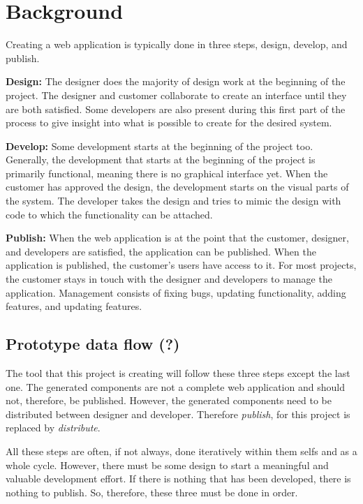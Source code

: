 \newpage
\section{Background}

Creating a web application is typically done in three steps, design, develop, and publish.

\textbf{Design:} The designer does the majority of design work at the beginning of the project. The designer and customer collaborate to create an interface until they are both satisfied.  Some developers are also present during this first part of the process to give insight into what is possible to create for the desired system.

\textbf{Develop:} Some development starts at the beginning of the project too. Generally, the development that starts at the beginning of the project is primarily functional, meaning there is no graphical interface yet. When the customer has approved the design, the development starts on the visual parts of the system. The developer takes the design and tries to mimic the design with code to which the functionality can be attached.  

\textbf{Publish:} When the web application is at the point that the customer, designer, and developers are satisfied, the application can be published. When the application is published, the customer's users have access to it. For most projects, the customer stays in touch with the designer and developers to manage the application. Management consists of fixing bugs, updating functionality, adding features, and updating features.

\subsection{Prototype data flow (?)}%
\label{sub:Prototype data flow}
The tool that this project is creating will follow these three steps except the last one. The generated components are not a complete web application and should not, therefore, be published. However, the generated components need to be distributed between designer and developer. Therefore \textit{publish}, for this project is replaced by \textit{distribute}. 

All these steps are often, if not always, done iteratively within them selfs and as a whole cycle. However, there must be some design to start a meaningful and valuable development effort. If there is nothing that has been developed, there is nothing to publish. So, therefore, these three must be done in order. 

